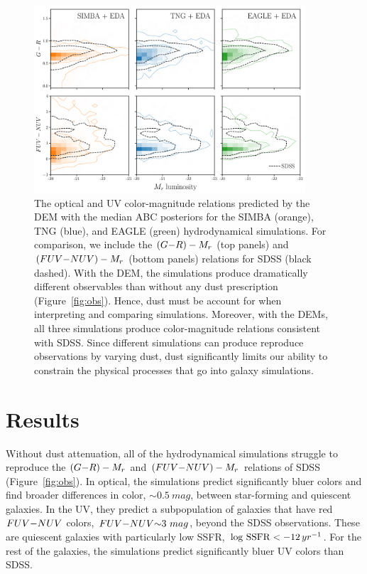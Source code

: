 \begin{figure}
\begin{center}
    \includegraphics[width=0.9\textwidth]{figs/abc_observables.pdf}
    \caption{\label{fig:dem}
    The optical and UV color-magnitude relations predicted by the DEM with 
    the median ABC posteriors for the SIMBA (orange), TNG (blue), and EAGLE
    (green) hydrodynamical simulations. For comparison, we include the 
    $(G{-}R) - M_r$ (top panels) and $(FUV{-}NUV) - M_r$ (bottom panels) relations
    for SDSS (black dashed). With the DEM, the simulations produce dramatically 
    different observables than without any dust prescription (Figure~\ref{fig:obs}). 
    Hence, dust must be account for when interpreting and comparing simulations.
    Moreover, with the DEMs, all three simulations produce color-magnitude
    relations consistent with SDSS. Since different simulations can 
    produce reproduce observations by varying dust, dust significantly limits
    our ability to constrain the physical processes that go into galaxy
    simulations. 
    }
\end{center}
\end{figure}

\section{Results} \label{sec:results}
Without dust attenuation, all of the hydrodynamical simulations struggle to 
reproduce the $(G{-}R) - M_r$ and $(FUV{-}NUV) - M_r$ relations of SDSS (Figure~\ref{fig:obs}). 
In optical, the simulations predict significantly bluer colors and find  
broader differences in color, ${\sim}0.5~mag$, between star-forming and
quiescent galaxies. In the UV, they predict a subpopulation of galaxies that
have red $FUV{-}NUV$ colors, $FUV{-}NUV{\sim}3~mag$, beyond the SDSS observations. 
These are quiescent galaxies with particularly low SSFR, $\log\,{\rm SSFR} <
-12\,yr^{-1}$. For the rest of the galaxies, the simulations predict
significantly bluer UV colors than SDSS. 


